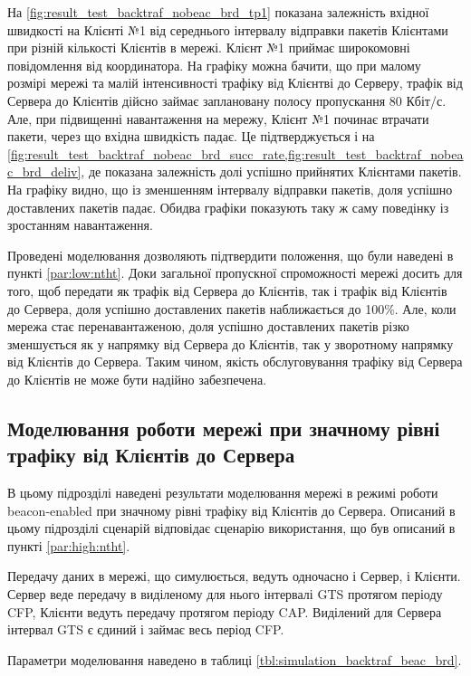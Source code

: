 \documentclass[a4paper,ukrainian,utf8,nocolumnsxix,nocolumnxxxii,nocolumnxxxi,floatsection,equationsection]{eskdtext}
\newcommand{\bem}[0]{beacon-enabled\xspace}
\begin{document}
На \cref{fig:result_test_backtraf_nobeac_brd_tp1} показана залежність вхідної швидкості на Клієнті №1 від середнього інтервалу відправки пакетів Клієнтами при різній кількості Клієнтів в мережі. Клієнт №1 приймає широкомовні повідомлення від координатора. На графіку можна бачити, що при малому розмірі мережі та малій інтенсивності трафіку від Клієнтві до Серверу, трафік від Сервера до Клієнтів дійсно займає заплановану полосу пропускання 80 Кбіт/с. Але, при підвищенні навантаження на мережу, Клієнт №1 починає втрачати пакети, через що вхідна швидкість падає. Це підтверджується і на \cref{fig:result_test_backtraf_nobeac_brd_succ_rate,fig:result_test_backtraf_nobeac_brd_deliv}, де показана залежність долі успішно прийнятих Клієнтами пакетів. На графіку видно, що із зменшенням інтервалу відправки пакетів, доля успішно доставлених пакетів падає. Обидва графіки показують таку ж саму поведінку із зростанням навантаження. 


Проведені моделювання дозволяють підтвердити положення, що були наведені в пункті \ref{par:low:ntht}. Доки загальної пропускної спроможності мережі досить для того, щоб передати як трафік від Сервера до Клієнтів, так і трафік від Клієнтів до Сервера, доля успішно доставлених пакетів наближається до 100\%. Але, коли мережа стає перенавантаженою, доля успішно доставлених пакетів різко зменшується як у напрямку від Сервера до Клієнтів, так у зворотному напрямку від Клієнтів до Сервера. Таким чином, якість обслуговування трафіку від Сервера до Клієнтів не може бути надійно забезпечена.


\subsection{Моделювання роботи мережі при значному рівні трафіку від Клієнтів до Сервера}
\label{par:simulation_backtraf_beac}

В цьому підрозділі наведені результати моделювання мережі в режимі роботи \bem при значному рівні трафіку від Клієнтів до Сервера. Описаний в цьому підрозділі сценарій відповідає сценарію використання, що був описаний в пункті \ref{par:high:ntht}.

Передачу даних в мережі, що симулюється, ведуть одночасно і Сервер, і Клієнти. Сервер веде передачу в виділеному для нього інтервалі GTS протягом періоду CFP, Клієнти ведуть передачу протягом періоду CAP. Виділений для Сервера інтервал GTS є єдиний і займає весь період CFP.

Параметри моделювання наведено в таблиці \ref{tbl:simulation_backtraf_beac_brd}.
\end{document}
